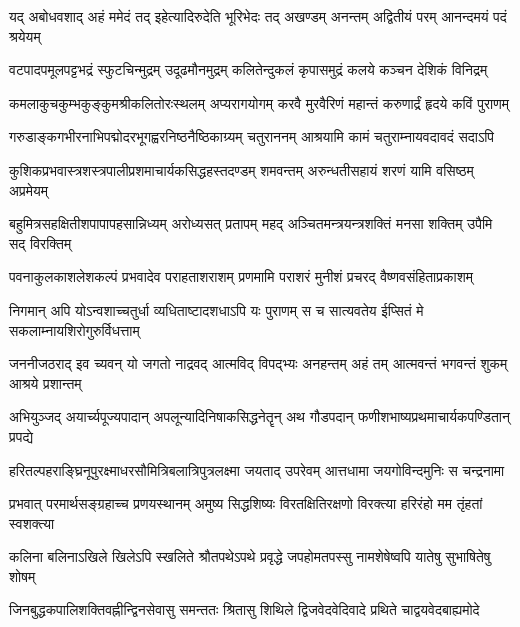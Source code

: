 

\twolineshloka
{यद् अबोधवशाद् अहं ममेदं तद् इहेत्यादिरुदेति भूरिभेदः}
{तद् अखण्डम् अनन्तम् अद्वितीयं परम् आनन्दमयं पदं श्रयेयम्}%

\twolineshloka
{वटपादपमूलपट्टभद्रं स्फुटचिन्मुद्रम् उदूढमौनमुद्रम्}
{कलितेन्दुकलं कृपासमुद्रं कलये कञ्चन देशिकं विनिद्रम्}%

\twolineshloka
{कमलाकुचकुम्भकुङ्कुमश्रीकलितोरःस्थलम् अप्यरागयोगम्}
{करवै मुरवैरिणं महान्तं करुणार्द्रं हृदये कविं पुराणम्}%

\twolineshloka
{गरुडाङ्कगभीरनाभिपद्मोदरभूगह्वरनिष्ठनैष्ठिकाग्र्यम्}
{चतुराननम् आश्रयामि कामं चतुराम्नायवदावदं सदाऽपि}%

\twolineshloka
{कुशिकप्रभवास्त्रशस्त्रपालीप्रशमाचार्यकसिद्धहस्तदण्डम्}
{शमवन्तम् अरुन्धतीसहायं शरणं यामि वसिष्ठम् अप्रमेयम्}%

\twolineshloka
{बहुमित्रसहक्षितीशपापापहसान्निध्यम् अरोध्यसत् प्रतापम्}
{महद् अञ्चितमन्त्रयन्त्रशक्तिं मनसा शक्तिम् उपैमि सद् विरक्तिम्}%

\twolineshloka
{पवनाकुलकाशलेशकल्पं प्रभवादेव पराहताशराशम्}
{प्रणमामि पराशरं मुनीशं प्रचरद् वैष्णवसंहिताप्रकाशम्}%

\twolineshloka
{निगमान् अपि योऽन्वशाच्चतुर्धा व्यधिताष्टादशधाऽपि यः पुराणम्}
{स च सात्यवतेय ईप्सितं मे सकलाम्नायशिरोगुरुर्विधत्ताम्}%

\twolineshloka
{जननीजठराद् इव च्यवन् यो जगतो नाद्रवद् आत्मविद् विपद्भ्यः}
{अनहन्तम् अहं तम् आत्मवन्तं भगवन्तं शुकम् आश्रये प्रशान्तम्}%

\twolineshloka
{अभियुञ्जद् अयार्च्यपूज्यपादान् अपलून्यादिनिषाकसिद्धनेतॄन्}
{अथ गौडपदान् फणीशभाष्यप्रथमाचार्यकपण्डितान् प्रपद्ये}%

\twolineshloka
{हरितल्पहराङ्घ्रिनूपुरक्ष्माधरसौमित्रिबलात्रिपुत्रलक्ष्मा}
{जयताद् उपरेवम् आत्तधामा जयगोविन्दमुनिः स चन्द्रनामा}%

\twolineshloka
{प्रभवात् परमार्थसङ्ग्रहाच्च प्रणयस्थानम् अमुष्य सिद्धशिष्यः}
{विरतक्षितिरक्षणो विरक्त्या हरिरंहो मम तृंहतां स्वशक्त्या}%

\twolineshloka
{कलिना बलिनाऽखिले खिलेऽपि स्खलिते श्रौतपथेऽपथे प्रवृद्धे}
{जपहोमतपस्सु नामशेषेष्वपि यातेषु सुभाषितेषु शोषम्}%

\twolineshloka
{जिनबुद्धकपालिशक्तिवह्नीन्द्विनसेवासु समन्ततः श्रितासु}
{शिथिले द्विजवेदवेदिवादे प्रथिते चाद्वयवेदबाह्यमोदे}%

